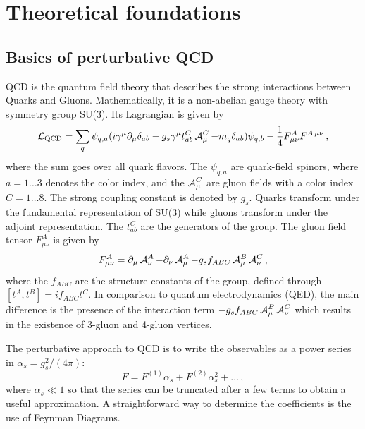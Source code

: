 
\chapter{Theoretical foundations}
%
\section{Basics of perturbative QCD}
QCD is the quantum field theory that describes the strong interactions between Quarks and Gluons.
Mathematically, it is a non-abelian gauge theory with symmetry group SU(3).
Its Lagrangian is given by
%
\begin{equation}
  \operatorname{\mathcal{L}}_\text{QCD} = \sum_q \bar\psi_{q,a} (i \gamma^\mu \partial_\mu \delta_{ab} - g_s \gamma^\mu t_{ab}^C \operatorname{\mathcal{A}}_\mu^C - m_q \delta_{ab}) \psi_{q,b} - \frac{1}{4} F_{\mu \nu}^A F^{A \, \mu \nu} \, ,
\end{equation}
%
where the sum goes over all quark flavors.
The $\psi_{q,a}$ are quark-field spinors, where $a=1 \dots 3$ denotes the color index, and the $\operatorname{\mathcal{A}}_\mu^C$ are gluon fields with a color index $C=1 \dots 8$.
The strong coupling constant is denoted by $g_s$.
Quarks transform under the fundamental representation of SU(3) while gluons transform under the adjoint representation.
The $t_{ab}^C$ are  the generators of the group.
The gluon field tensor $F_{\mu \nu}^A$ is given by
%
\begin{equation}
	F_{\mu \nu}^A = \partial_\mu \operatorname{\mathcal{A}}_\nu^A - \partial_\nu \operatorname{\mathcal{A}}_\mu^A - g_s f_{ABC} \operatorname{\mathcal{A}}_\mu^B \operatorname{\mathcal{A}}_\nu^C \, ,
\end{equation}
%
where the $f_{ABC}$ are the structure constants of the group, defined through $[ t^A,t^B ] = i f_{ABC} t^C$.
In comparison to quantum electrodynamics (QED), the main difference is the presence of the interaction term $- g_s f_{ABC} \operatorname{\mathcal{A}}_\mu^B \operatorname{\mathcal{A}}_\nu^C$ which results in the existence of 3-gluon and 4-gluon vertices.

The perturbative approach to QCD is to write the observables as a power series in $\alpha_s = g_s^2/(4 \pi)$:
%
\begin{equation}
  F = F^{(1)} \alpha_s + F^{(2)} \alpha_s^2 + \dots \, ,
\end{equation}
%
where $\alpha_s \ll 1$ so that the series can be truncated after a few terms to obtain a useful approximation.
A straightforward way to determine the coefficients is the use of Feynman Diagrams.
%
